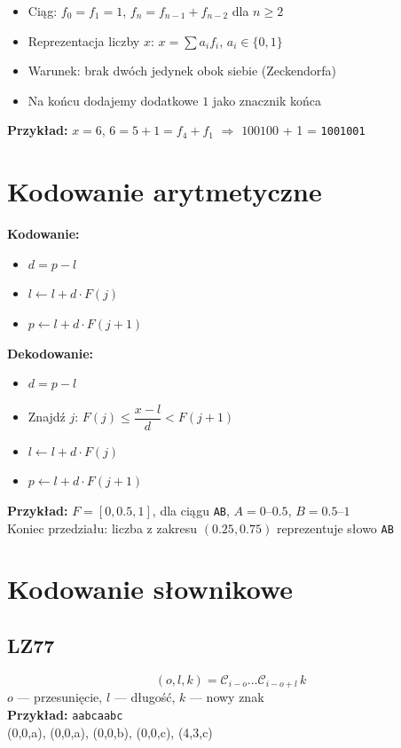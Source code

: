 \documentclass{../konspekt}
\begin{document}
\begin{multicols}{2}
  \begin{itemize}
    \item Ciąg: $f_0 = f_1 = 1$, $f_n = f_{n-1} + f_{n-2}$ dla $n \geq 2$
    \item Reprezentacja liczby $x$: $x = \sum a_i f_i$, $a_i \in \{0,1\}$
    \item Warunek: brak dwóch jedynek obok siebie (Zeckendorfa)
    \item Na końcu dodajemy dodatkowe $1$ jako znacznik końca
  \end{itemize}
  \textbf{Przykład:} $x = 6$, $6 = 5 + 1 = f_4 + f_1$ $\Rightarrow$
  $100100$ + 1 = \texttt{1001001}

  \section*{Kodowanie arytmetyczne}
  \begin{multicols}{2}
    \textbf{Kodowanie:}
    \begin{itemize}
      \item $d = p - l$
      \item $l \gets l + d \cdot F(j)$
      \item $p \gets l + d \cdot F(j+1)$
    \end{itemize}
    \columnbreak
    \textbf{Dekodowanie:}
    \begin{itemize}
      \item $d = p - l$
      \item Znajdź $j$: $F(j) \leq \dfrac{x - l}{d} < F(j+1)$
      \item $l \gets l + d \cdot F(j)$
      \item $p \gets l + d \cdot F(j+1)$
    \end{itemize}
  \end{multicols}
  \textbf{Przykład:} $F = [0, 0.5, 1]$, dla ciągu \texttt{AB},
  $A=0$–$0.5$, $B=0.5$–$1$ \\
  Koniec przedziału: liczba z zakresu $(0.25, 0.75)$ reprezentuje
  słowo \texttt{AB}

  \section*{Kodowanie słownikowe}

  \begin{multicols}{3}
    \subsection*{LZ77}
    $$
    (o, l, k) = \mathcal{C}_{i - o} \dots \mathcal{C}_{i - o + l} \, k
    $$
    \footnotesize
    $o$ — przesunięcie, $l$ — długość, $k$ — nowy znak \\
    \textbf{Przykład:} \texttt{aabcaabc} \\
    (0,0,a), (0,0,a), (0,0,b), (0,0,c), (4,3,c)


\end{multicols}
\end{multicols}
\end{document}
